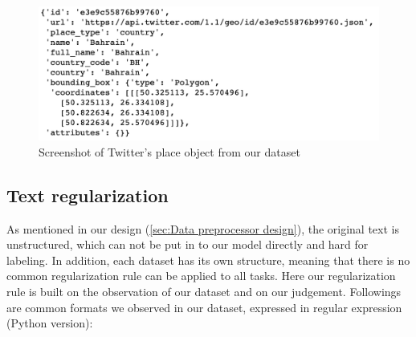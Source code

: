 \begin{figure}[!htbp]
    \centering
    \includegraphics[width=5in]{images/twitter_place.png}
    \caption{Screenshot of Twitter's place object from our dataset}
    \label{fig:twitter_place}
\end{figure}

\subsection{Text regularization}
As mentioned in our design (\ref{sec:Data preprocessor design}), the original text is unstructured, which can not be put in to our model directly and hard for labeling. In addition, each dataset has its own structure, meaning that there is no common regularization rule can be applied to all tasks. Here our regularization rule is built on the observation of our dataset and on our judgement. Followings are common formats we observed in our dataset, expressed in regular expression (Python version):
